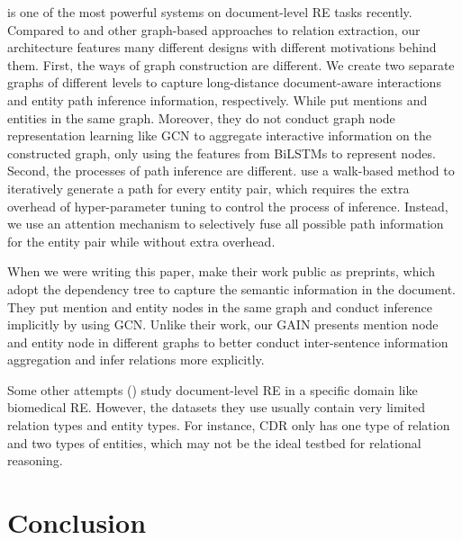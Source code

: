 \documentclass[11pt,a4paper]{article}
\begin{document}
\citep{christopoulou-etal-2019-connecting} is one of the most powerful systems on document-level RE tasks recently. 
Compared to \citep{christopoulou-etal-2019-connecting} and other graph-based approaches to relation extraction, our architecture features many different designs with different motivations behind them. First, the ways of graph construction are different. We create two separate graphs of different levels to capture long-distance document-aware interactions and entity path inference information, respectively. While \citet{christopoulou-etal-2019-connecting} put mentions and entities in the same graph. Moreover, they do not conduct graph node representation learning like GCN to aggregate interactive information on the constructed graph, only using the features from BiLSTMs to represent nodes. Second, the processes of path inference are different. \citet{christopoulou-etal-2019-connecting} use a walk-based method to iteratively generate a path for every entity pair, which requires the extra overhead of hyper-parameter tuning to control the process of inference. Instead, we use an attention mechanism to selectively fuse all possible path information for the entity pair while without extra overhead.

When we were writing this paper, \citep{LSR} make their work public as preprints, which adopt the dependency tree to capture the semantic information in the document. They put mention and entity nodes in the same graph and conduct inference implicitly by using GCN.
Unlike their work, our GAIN presents mention node and entity node in different graphs to better conduct inter-sentence information aggregation and infer relations more explicitly. 

Some other attempts (\citealp{verga-2018-simultaneously, sahu-etal-19-inter, christopoulou-etal-2019-connecting}) study document-level RE in a specific domain like biomedical RE.
However, the datasets they use usually contain very limited relation types and entity types. 
For instance, CDR \citep{li2016biocreative} only has one type of relation and two types of entities, which may not be the ideal testbed for relational reasoning. 
%
 \section{Conclusion}
\end{document}
